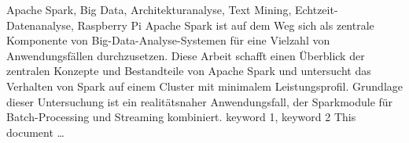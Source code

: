 \documentclass[draft=false
              ,paper=a4
              ,twoside=false
              ,fontsize=11pt
              ,headsepline
              ,BCOR10mm
              ,DIV11
              ]{scrbook}
\begin{document}


\frontmatter

\maketitle

\onehalfspacing

\HAWAbstractPage
{Apache Spark, Big Data, Architekturanalyse, Text Mining, Echtzeit-Datenanalyse, Raspberry Pi}%
{Apache Spark ist auf dem Weg sich als zentrale Komponente von Big-Data-Analyse-Systemen für eine Vielzahl von Anwendungsfällen durchzusetzen. Diese Arbeit schafft einen Überblick der zentralen Konzepte und Bestandteile von Apache Spark und untersucht das Verhalten von Spark auf einem Cluster mit minimalem Leistungsprofil. Grundlage dieser Untersuchung ist ein realitätsnaher Anwendungsfall, der Sparkmodule für Batch-Processing und Streaming kombiniert.}
{keyword 1, keyword 2}%
{This document \ldots}

\newpage
\singlespacing

\tableofcontents

\newpage
\listoffigures
\listoftables
\lstlistoflistings

\mainmatter
\onehalfspacing




%


\backmatter


\newpage
\glstoctrue
\printglossary[title=Acronyme,toctitle=Acronyme,type=\acronymtype]
\printglossary[title=Glossar, toctitle=Glossar]
\end{document}

